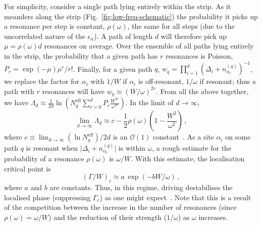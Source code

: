 \documentclass[aps,prl,twocolumn,superscriptaddress,nobalancelastpage,longbibliography]{revtex4-2}
\newcommand\npeff{N_q^{\mathrm{eff}}}
\begin{document}
For simplicity, consider a single path lying entirely within the strip. As it meanders along the strip (Fig.~\ref{fig:low-freq-schematic}) the probability it picks up a resonance per step is constant, $\rho(\omega)$, the same for all steps (due to the uncorrelated nature of the $\epsilon_\alpha$). A path of length $d$ will therefore pick up $\mu=\rho(\omega)d$ resonances on average. Over the ensemble of all paths lying entirely in the strip, the probability that a given path has $r$ resonances is Poisson, $P_r=\exp(-\mu)\mu^r/r!$. Finally, for a given path $q$, $w_q=\prod_{i=1}^d (\Delta_i+n^{(q)}_{\alpha_i})^{-1}$, we replace the factor for $\alpha_i$ with $1/W$ if $\alpha_i$ is off-resonant, $1/\omega$ if resonant; thus a path with $r$ resonances will have $w_q\approx (W/\omega)^{2r}$. 
From all the above together, we have $\Lambda_d\approx\frac{1}{2d}\ln\left(\npeff \sum_{r=0}^d P_r \frac{W^{2r}}{\omega^{2r}}\right)$. In the limit of $d\to\infty$,
\begin{equation}
	\lim_{d\to\infty}\Lambda_d\approx c-\frac{1}{2}\rho(\omega)\left(1-\frac{W^2}{\omega^2}\right)\,,
\end{equation}
where $c\equiv\lim_{d\to\infty}(\ln\npeff)/2d$ is an $\mathcal{O}(1)$ constant~\cite{supp}.
As a site $\alpha_i$ on some path $q$ is resonant when $\vert\Delta_i+n_{\alpha_i}^{(q)}\vert$ is within $\omega$, a rough estimate for the probability of a resonance $\rho(\omega)$ is $\omega/W$. With this estimate, the localisation critical point is
\begin{equation}
	(\Gamma/W)_c\approx a\,\exp(-bW/\omega)\,,
	\label{eq:Gammac-low-freq}	
\end{equation}
where $a$ and $b$ are constants. Thus, in this regime, driving destabilises the localised phase (suppressing $\Gamma_c$) as one might expect~\cite{lazarides2015fate,ponte2015many,abanin2016theory}. Note that this is a result of the competition between the increase in the number of resonances (since $\rho(\omega)=\omega/W$) and the reduction of their strength ($1/\omega$) as $\omega$ increases.
\end{document}

